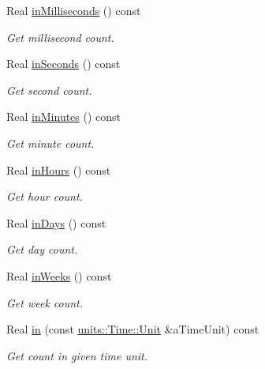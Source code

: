 \begin{DoxyCompactItemize}
Real \hyperlink{classlibrary_1_1physics_1_1time_1_1_duration_ac7c1fce0e8488954fe9e2abe1767548b}{in\+Milliseconds} () const
\begin{DoxyCompactList}\small\item\em Get millisecond count. \end{DoxyCompactList}\item 
Real \hyperlink{classlibrary_1_1physics_1_1time_1_1_duration_a9272debd96e7f86df9b0852c6663a0bb}{in\+Seconds} () const
\begin{DoxyCompactList}\small\item\em Get second count. \end{DoxyCompactList}\item 
Real \hyperlink{classlibrary_1_1physics_1_1time_1_1_duration_aef580516014096d1e5ae5bb6ae8e6f29}{in\+Minutes} () const
\begin{DoxyCompactList}\small\item\em Get minute count. \end{DoxyCompactList}\item 
Real \hyperlink{classlibrary_1_1physics_1_1time_1_1_duration_a1f5e207d7c6f7b62d3cfee13e75dfa48}{in\+Hours} () const
\begin{DoxyCompactList}\small\item\em Get hour count. \end{DoxyCompactList}\item 
Real \hyperlink{classlibrary_1_1physics_1_1time_1_1_duration_a73ebd929416f360ff5c4c840fbcae67b}{in\+Days} () const
\begin{DoxyCompactList}\small\item\em Get day count. \end{DoxyCompactList}\item 
Real \hyperlink{classlibrary_1_1physics_1_1time_1_1_duration_ae49243cf87ccf07693b65e7170642b65}{in\+Weeks} () const
\begin{DoxyCompactList}\small\item\em Get week count. \end{DoxyCompactList}\item 
Real \hyperlink{classlibrary_1_1physics_1_1time_1_1_duration_ace9b1e589d3dc6e76002d389e2a480df}{in} (const \hyperlink{classlibrary_1_1physics_1_1units_1_1_time_ab876a6a05c9a2f28905f2753bfd64109}{units\+::\+Time\+::\+Unit} \&a\+Time\+Unit) const
\begin{DoxyCompactList}\small\item\em Get count in given time unit. \end{DoxyCompactList}\item 

\end{DoxyCompactItemize}
